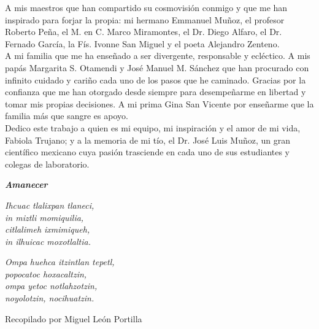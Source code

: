 \newpage

A mis maestros que han compartido su cosmovisión conmigo y que me han inspirado para forjar la propia: mi hermano Emmanuel Muñoz, el profesor Roberto Peña, el M. en C. Marco Miramontes, el Dr. Diego Alfaro, el Dr. Fernado García, la Fís. Ivonne San Miguel y el poeta Alejandro Zenteno.\\

A mi familia que me ha enseñado a ser divergente, responsable y ecléctico. A mis papás Margarita S. Otamendi y José Manuel M. Sánchez que han procurado con infinito cuidado y cariño cada uno de los pasos que he caminado. Gracias por la confianza que me han otorgado desde siempre para desempeñarme en libertad y tomar mis propias decisiones. A mi prima Gina San Vicente por enseñarme que la familia más que sangre es apoyo.\\

Dedico este trabajo a quien es mi equipo, mi inspiración y el amor de mi vida, Fabiola Trujano; y a la memoria de mi tío, el Dr. José Luis Muñoz, un gran científico mexicano cuya pasión trasciende en cada uno de sus estudiantes y colegas de laboratorio.\\

\vspace{40mm} 

\begin{center}

\textbf{\textit{Amanecer}}\\
\vspace{2mm} 


\textit{Ihcuac tlalixpan tlaneci,}\\
\textit{in miztli momiquilia,}\\
\textit{citlalimeh ixmimiqueh,}\\
\textit{in ilhuicac moxotlaltia.}\\

\vspace{2mm} 

\textit{Ompa huehca itzintlan tepetl,}\\
\textit{popocatoc hoxacaltzin,}\\
\textit{ompa yetoc notlahzotzin,}\\
\textit{noyolotzin, nocihuatzin.}\\

\vspace{2mm}

Recopilado por Miguel León Portilla 

\end{center}